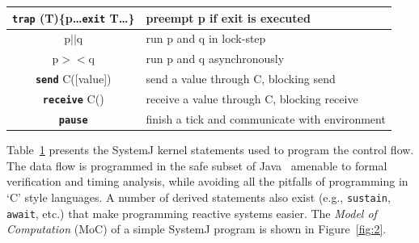 \begin{table}[tb]
\begin{minipage}{0.45\textwidth}
\begin{scriptsize}
\begin{tabular}{|c|p{80pt}|}
     \textbf{\texttt{trap}} (T)\{p\ldots \textbf{\texttt{exit}} T\ldots\} & preempt p if exit is executed\\                         
     \hline                                                                                     
     p\textbf{\texttt{$||$}}q & run p and q in lock-step\\                                                        
     \hline                                                                                     
     p$><$q & run p and q asynchronously\\                                                      
     \hline                                                                                     
     \textbf{\texttt{send}} C([value]) & send a value through C, blocking
     send\\                                                 
     \hline                                                                                     
     \textbf{\texttt{receive}} C() & receive a value through C, blocking
     receive\\
     \hline                                                                                     
     \textbf{\texttt{pause}} & finish a tick and communicate
     with environment\\
     \hline                                                                                     
   \end{tabular}
 \label{tab:1}
  \end{scriptsize}
 \end{minipage}
\end{table}

Table~\ref{tab:1} presents the SystemJ kernel statements used to program
the control flow. The data flow is programmed in the safe subset of
Java~\cite{scj2013} amenable to formal verification and timing analysis,
while avoiding all the pitfalls of programming in `C' style languages. A
number of derived statements also exist (e.g., \texttt{sustain},
\texttt{await}, etc.) that make programming reactive systems easier. The
\textit{Model of Computation} (MoC) of a simple SystemJ program is shown
in Figure~\ref{fig:2}.

